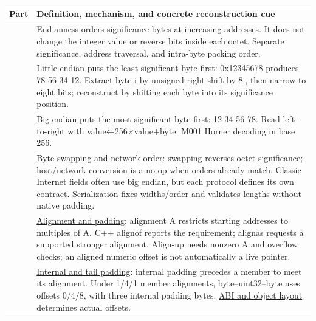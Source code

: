{\def\LTcaptype{none} %
\begin{longtable}[]{@{}
  >{\raggedright\arraybackslash}p{}
  >{\raggedright\arraybackslash}p{}@{}}
\toprule\noalign{}
\begin{minipage}[b]{\linewidth}\raggedright
Part
\end{minipage} & \begin{minipage}[b]{\linewidth}\raggedright
Definition, mechanism, and concrete reconstruction cue
\end{minipage} \\
\midrule\noalign{}
\endhead
\bottomrule\noalign{}
\endlastfoot
41 & \hyperref[appendix-bc07c3d25b18]{Endianness} orders significance bytes at increasing addresses. It does not change the integer value or reverse bits inside each octet. Separate significance, address traversal, and intra-byte packing order. \\
42 & \hyperref[appendix-367b6abf460e]{Little endian} puts the least-significant byte first: 0x12345678 produces 78 56 34 12. Extract byte i by unsigned right shift by 8i, then narrow to eight bits; reconstruct by shifting each byte into its significance position. \\
43 & \hyperref[appendix-92e040df969a]{Big endian} puts the most-significant byte first: 12 34 56 78. Read left-to-right with value←256×value+byte: M001 Horner decoding in base 256. \\
44 & \hyperref[appendix-11ba36693aa2]{Byte swapping and network order}: swapping reverses octet significance; host/network conversion is a no-op when orders already match. Classic Internet fields often use big endian, but each protocol defines its own contract. \hyperref[appendix-91d09ebed979]{Serialization} fixes widths/order and validates lengths without native padding. \\
45 & \hyperref[appendix-a1f7c53b4742]{Alignment and padding}: alignment A restricts starting addresses to multiples of A. C++ alignof reports the requirement; alignas requests a supported stronger alignment. Align-up needs nonzero A and overflow checks; an aligned numeric offset is not automatically a live pointer. \\
46 & \hyperref[appendix-f52f8c5a3afd]{Internal and tail padding}: internal padding precedes a member to meet its alignment. Under 1/4/1 member alignments, byte--uint32--byte uses offsets 0/4/8, with three internal padding bytes. \hyperref[appendix-c4ac6bb0fff8]{ABI and object layout} determines actual offsets. \\

\end{longtable}}
